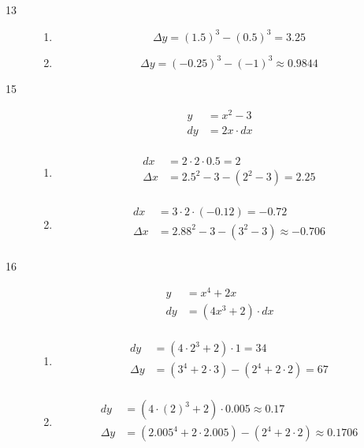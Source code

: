 \documentclass[fleqn]{exam}
\begin{document}
\begin{description}
\begin{enumerate}[a]
\end{enumerate}

\item[13]
\begin{enumerate}[a]
\item
\[
  \Delta y = (1.5)^3 - (0.5)^3 = 3.25
\]

\item
\[
  \Delta y = (-0.25)^3 - (-1)^3 \approx 0.9844
\]

\end{enumerate}

\item[15]
\begin{align*}
  y &= x^2 - 3 \\
  dy &= 2x \cdot dx \\
\end{align*}

\begin{enumerate}[a]
\item
\begin{align*}
  dx &= 2 \cdot 2 \cdot 0.5 = 2 \\
  \Delta x &= 2.5^2 - 3 - (2^2 - 3) = 2.25 \\
\end{align*}

\item
\begin{align*}
  dx &= 3 \cdot 2 \cdot (-0.12) = -0.72 \\
  \Delta x &= 2.88^2 - 3 - (3^2 - 3) \approx -0.706 \\
\end{align*}

\end{enumerate}

\item[16]
\begin{align*}
  y &= x^4 + 2x \\
  dy &= (4x^3 + 2) \cdot dx \\
\end{align*}

\begin{enumerate}[a]
\item
\begin{align*}
  dy &= (4 \cdot 2^3 + 2) \cdot 1 = 34 \\
  \Delta y &= (3^4 + 2 \cdot 3) - (2^4 + 2 \cdot 2) = 67 \\
\end{align*}

\item
\begin{align*}
  dy &= (4 \cdot (2)^3 + 2) \cdot 0.005 \approx 0.17\\
  \Delta y &= (2.005^4 + 2 \cdot 2.005) - (2^4 + 2 \cdot 2) \approx 0.1706 \\
\end{align*}


\end{enumerate}
\end{description}
\end{document}
